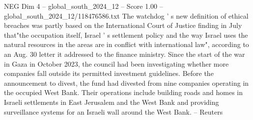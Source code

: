 \begin{textsample}{NEG Dim 4 – global\_south\_2024\_12 – Score 1.00 – global\_south\_2024\_12/118476586.txt}
The watchdog ' s new definition of ethical breaches was partly based on the International Court of Justice finding in July that"the occupation itself, Israel ' s settlement policy and the way Israel uses the natural resources in the areas are in conflict with international law", according to an Aug. 30 letter it addressed to the finance ministry.
Since the start of the war in Gaza in October 2023, the council had been investigating whether more companies fall outside its permitted investment guidelines.
Before the announcement to divest, the fund had divested from nine companies operating in the occupied West Bank.
Their operations include building roads and homes in Israeli settlements in East Jerusalem and the West Bank and providing surveillance systems for an Israeli wall around the West Bank. -- Reuters

\end{textsample}
